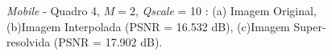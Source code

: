 \begin{figure}[H]
    \centering
    \qquad
	

    \caption{\textit{Mobile} - Quadro 4, $M = 2$, \textit{Qscale} = 10 : (a) Imagem Original, (b)Imagem Interpolada (PSNR = 16.532 dB), (c)Imagem Super-resolvida (PSNR = 17.902 dB).}
	    
    \label{fig:3}
\end{figure}

